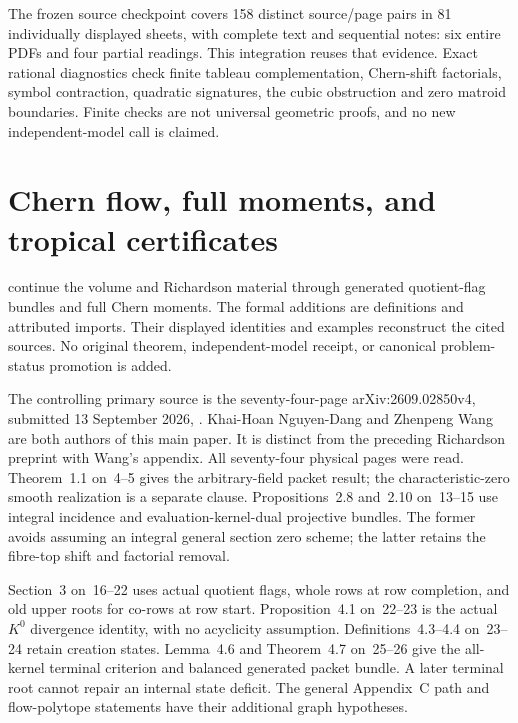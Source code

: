 The frozen source checkpoint covers 158 distinct source/page
pairs in 81 individually displayed sheets, with complete text
and sequential notes: six entire PDFs and four partial readings.
This integration reuses that evidence. Exact rational diagnostics
check finite tableau complementation, Chern-shift factorials,
symbol contraction, quadratic signatures, the cubic obstruction
and zero matroid boundaries. Finite checks are not universal
geometric proofs, and no new independent-model call is claimed.

\section{Chern flow, full moments, and tropical certificates}
\label{sec:appL-Chern-flow-sources}

continue the volume and Richardson material through generated
quotient-flag bundles and full Chern moments. The formal additions
are definitions and attributed imports. Their displayed identities
and examples reconstruct the cited sources. No original theorem,
independent-model receipt, or canonical problem-status promotion
is added.

The controlling primary source is the seventy-four-page
arXiv:2609.02850v4, submitted 13 September 2026,
\cite{NguyenDangWang26ChernFlowV4}. Khai-Hoan Nguyen-Dang
and Zhenpeng Wang are both authors of this main paper. It is
distinct from the preceding Richardson preprint with Wang's
appendix. All seventy-four physical pages were read.
Theorem~1.1 on~4--5 gives the arbitrary-field packet result;
the characteristic-zero smooth realization is a separate clause.
Propositions~2.8 and~2.10 on~13--15 use integral incidence
and evaluation-kernel-dual projective bundles. The former avoids
assuming an integral general section zero scheme; the latter
retains the fibre-top shift and factorial removal.

Section~3 on~16--22 uses actual quotient flags, whole rows
at row completion, and old upper roots for co-rows at row start.
Proposition~4.1 on~22--23 is the actual $K^0$ divergence identity,
with no acyclicity assumption. Definitions~4.3--4.4 on~23--24
retain creation states. Lemma~4.6 and Theorem~4.7 on~25--26
give the all-kernel terminal criterion and balanced generated
packet bundle. A later terminal root cannot repair an internal
state deficit. The general Appendix~C path and flow-polytope
statements have their additional graph hypotheses.

